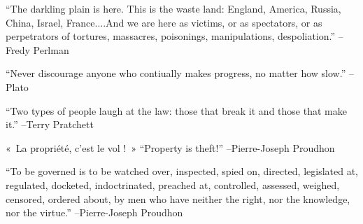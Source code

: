 \documentclass{article}%
\begin{document}
\linebreak%
\vspace{1mm}%
\begin{minipage}{\textwidth}%
\flushleft%
“The darkling plain is here. This is the waste land: England, America, Russia, China, Israel, France....And we are here as victims, or as spectators, or as perpetrators of tortures, massacres, poisonings, manipulations, despoliation.”%
\linebreak%
\vspace{1mm}%
–Fredy Perlman%
\linebreak%
\vspace{1mm}%
\end{minipage}%
\linebreak%
\vspace{1mm}%
\begin{minipage}{\textwidth}%
\flushleft%
“Never discourage anyone who contiually makes progress, no matter how slow.”%
\linebreak%
\vspace{1mm}%
–Plato%
\linebreak%
\vspace{1mm}%
\end{minipage}%
\linebreak%
\vspace{1mm}%
\begin{minipage}{\textwidth}%
\flushleft%
“Two types of people laugh at the law: those that break it and those that make it.”%
\linebreak%
\vspace{1mm}%
–Terry Pratchett%
\linebreak%
\vspace{1mm}%
\end{minipage}%
\linebreak%
\vspace{1mm}%
\begin{minipage}{\textwidth}%
\flushleft%
«~La propriété, c'est le vol !~»%
\linebreak%
\vspace{1mm}%
“Property is theft!”%
\linebreak%
–Pierre{-}Joseph Proudhon%
\linebreak%
\vspace{1mm}%
\end{minipage}%
\linebreak%
\vspace{1mm}%
\begin{minipage}{\textwidth}%
\flushleft%
“To be governed is to be watched over, inspected, spied on, directed, legislated at, regulated, docketed, indoctrinated, preached at, controlled, assessed, weighed, censored, ordered about, by men who have neither the right, nor the knowledge, nor the virtue.”%
\linebreak%
\vspace{1mm}%
–Pierre{-}Joseph Proudhon%
\linebreak%
\vspace{1mm}%
\end{minipage}%
\end{document}
